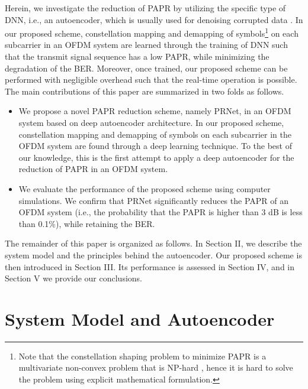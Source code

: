 \documentclass[journal]{IEEEtran}
\begin{document}
Herein, we investigate the reduction of PAPR by utilizing the specific type of DNN, i.e., an autoencoder, which is usually used for denoising corrupted data \cite{b9}. In our proposed scheme, constellation mapping and demapping of symbols\footnote{Note that the constellation shaping problem to minimize PAPR is a multivariate non-convex problem that is NP-hard \cite{b10}, hence it is hard to solve the problem using explicit mathematical formulation.} on each subcarrier in an OFDM system are learned through the training of DNN such that the transmit signal sequence has a low PAPR, while minimizing the degradation of the BER. Moreover, once trained, our proposed scheme can be performed with negligible overhead such that the real-time operation is possible. The main contributions of this paper are summarized in two folds as follows.
\begin{itemize}
    \item We propose a novel PAPR reduction scheme, namely PRNet, in an OFDM system based on deep autoencoder architecture. In our proposed scheme, constellation mapping and demapping of symbols on each subcarrier in the OFDM system are found through a deep learning technique. To the best of our knowledge, this is the first attempt to apply a deep autoencoder for the reduction of PAPR in an OFDM system.
    \item We evaluate the performance of the proposed scheme using computer simulations. We confirm that PRNet significantly reduces the PAPR of an OFDM system (i.e., the probability that the PAPR is higher than 3 dB is less than 0.1\%), while retaining the BER.
\end{itemize}

The remainder of this paper is organized as follows. In Section II, we describe the system model and the principles behind the autoencoder. Our proposed scheme is then introduced in Section III. Its performance is assessed in Section IV, and in Section V we provide our conclusions.

\section{System Model and Autoencoder}
\end{document}
